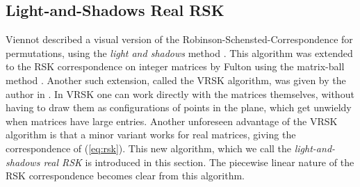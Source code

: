 \documentclass[10pt]{amsproc}
\theoremstyle{definition}
\theoremstyle{remark}
\begin{document}
\subsection{Light-and-Shadows Real RSK}
\label{sec:light-and-shadows-rsk}
Viennot described a visual version of the Robinson-Schensted-Correspondence for permutations, using the \emph{light and shadows} method \cite{viennot1977forme}.
This algorithm was extended to the RSK correspondence on integer matrices by Fulton using the matrix-ball method \cite{fulton}.
Another such extension, called the VRSK algorithm, was given by the author in \cite[Chapter~3]{rtcv}.
In VRSK one can work directly with the matrices themselves, without having to draw them as configurations of points in the plane, which get unwieldy when matrices have large entries.
Another unforeseen advantage of the VRSK algorithm is that a minor variant works for real matrices, giving the correspondence of (\ref{eq:rsk}).
This new algorithm, which we call the \emph{light-and-shadows real RSK} is introduced in this section.
The piecewise linear nature of the RSK correspondence becomes clear from this algorithm.
\end{document}
